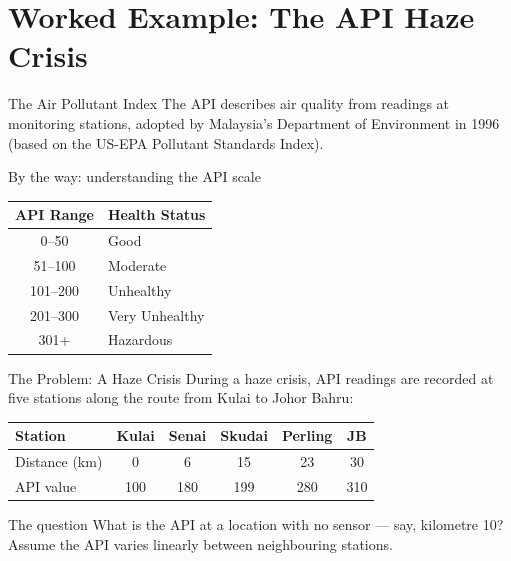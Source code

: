 \documentclass[9pt,aspectratio=169,xcolor=table]{beamer}
\begin{document}
\section{Worked Example: The API Haze Crisis}

\begin{frame}{The Air Pollutant Index}
    \leavevmode
    The API describes air quality from readings at monitoring stations,
    adopted by Malaysia's Department of Environment in 1996 (based on the
    US-EPA Pollutant Standards Index).

    \vspace{3mm}
    \begin{block}{By the way: understanding the API scale}
        \small
        \begin{center}
        \begin{tabular}{cl}
            \toprule
            \textbf{API Range} & \textbf{Health Status} \\
            \midrule
            0--50 & Good \\
            51--100 & Moderate \\
            101--200 & Unhealthy \\
            201--300 & Very Unhealthy \\
            301+ & Hazardous \\
            \bottomrule
        \end{tabular}
        \end{center}
    \end{block}
\end{frame}

\begin{frame}{The Problem: A Haze Crisis}
    \leavevmode
    During a haze crisis, API readings are recorded at five stations
    along the route from Kulai to Johor Bahru:

    \vspace{2mm}
    \small
    \begin{table}
    \centering
    \begin{tabular}{lccccc}
        \toprule
        \textbf{Station} & Kulai & Senai & Skudai & Perling & JB \\
        \midrule
        Distance (km) & 0 & 6 & 15 & 23 & 30 \\
        API value & 100 & 180 & 199 & 280 & 310 \\
        \bottomrule
    \end{tabular}
    \end{table}

    \vspace{3mm}
    \begin{alertblock}{The question}
        What is the API at a location with \alert{no sensor} --- say,
        kilometre 10? Assume the API varies linearly between neighbouring
        stations.
    \end{alertblock}
\end{frame}
\end{document}

